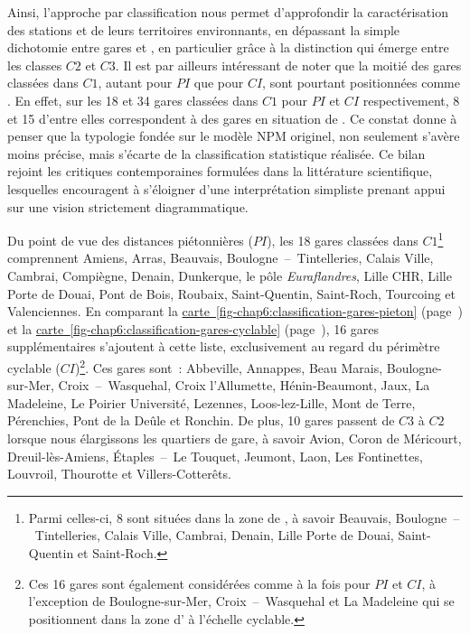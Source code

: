 \begin{refsegment}
Ainsi, l’approche par classification nous permet d’approfondir la caractérisation des stations et de leurs territoires environnants, en dépassant la simple dichotomie entre gares  et , en particulier grâce à la distinction qui émerge entre les classes \(C2\) et \(C3\). Il est par ailleurs intéressant de noter que la moitié des gares classées dans \(C1\), autant pour \(PI\) que pour \(CI\), sont pourtant positionnées comme . En effet, sur les 18 et 34 gares classées dans \(C1\) pour \(PI\) et \(CI\) respectivement, 8 et 15 d'entre elles correspondent à des gares en situation de . Ce constat donne à penser que la typologie fondée sur le modèle \acrshort{NPM} originel, non seulement s’avère moins précise, mais s’écarte de la classification statistique réalisée. Ce bilan rejoint les critiques contemporaines formulées dans la littérature scientifique, lesquelles encouragent à s’éloigner d’une interprétation simpliste prenant appui sur une vision strictement diagrammatique.%

Du point de vue des distances piétonnières (\(PI\)), les 18 gares classées dans \(C1\)\footnote{
    Parmi celles-ci, 8 sont situées dans la zone de , à savoir Beauvais, Boulogne~–~Tintelleries, Calais Ville, Cambrai, Denain, Lille Porte de Douai, Saint-Quentin et Saint-Roch.
} comprennent Amiens, Arras, Beauvais, Boulogne~–~Tintelleries, Calais Ville, Cambrai, Compiègne, Denain, Dunkerque, le pôle \textsl{Euraflandres}, Lille CHR, Lille Porte de Douai, Pont de Bois, Roubaix, Saint-Quentin, Saint-Roch, Tourcoing et Valenciennes. En comparant la \hyperref[fig-chap6:classification-gares-pieton]{carte~\ref{fig-chap6:classification-gares-pieton}} (page~\pageref{fig-chap6:classification-gares-pieton}) et la \hyperref[fig-chap6:classification-gares-cyclable]{carte~\ref{fig-chap6:classification-gares-cyclable}} (page~\pageref{fig-chap6:classification-gares-cyclable}), 16 gares supplémentaires s'ajoutent à cette liste, exclusivement au regard du périmètre cyclable (\(CI\))\footnote{
    Ces 16 gares sont également considérées comme  à la fois pour \(PI\) et \(CI\), à l'exception de Boulogne-sur-Mer, Croix~–~Wasquehal et La Madeleine qui se positionnent dans la zone d' à l'échelle cyclable.
}. Ces gares sont~: Abbeville, Annappes, Beau Marais, Boulogne-sur-Mer, Croix~–~Wasquehal, Croix l'Allumette, Hénin-Beaumont, Jaux, La Madeleine, Le Poirier Université, Lezennes, Loos-lez-Lille, Mont de Terre, Pérenchies, Pont de la Deûle et Ronchin. De plus, 10 gares passent de \(C3\) à \(C2\) lorsque nous élargissons les quartiers de gare, à savoir Avion, Coron de Méricourt, Dreuil-lès-Amiens, Étaples~–~Le Touquet, Jeumont, Laon, Les Fontinettes, Louvroil, Thourotte et Villers-Cotterêts.%


\end{refsegment}
